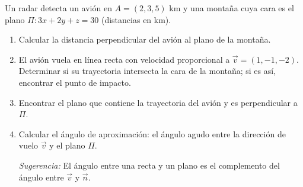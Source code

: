 Un radar detecta un avión en $A = (2, 3, 5)$ km y una montaña cuya cara es el plano $\Pi: 3x + 2y + z = 30$ (distancias en km).
\begin{enumerate}
    \item Calcular la distancia perpendicular del avión al plano de la montaña.
    \item El avión vuela en línea recta con velocidad proporcional a $\vec{v} = (1, -1, -2)$. Determinar si su trayectoria intersecta la cara de la montaña; si es así, encontrar el punto de impacto.
    \item Encontrar el plano que contiene la trayectoria del avión y es perpendicular a $\Pi$.
    \item Calcular el ángulo de aproximación: el ángulo agudo entre la dirección de vuelo $\vec{v}$ y el plano $\Pi$.

    \textit{Sugerencia:} El ángulo entre una recta y un plano es el complemento del ángulo entre $\vec{v}$ y $\vec{n}$.
\end{enumerate}